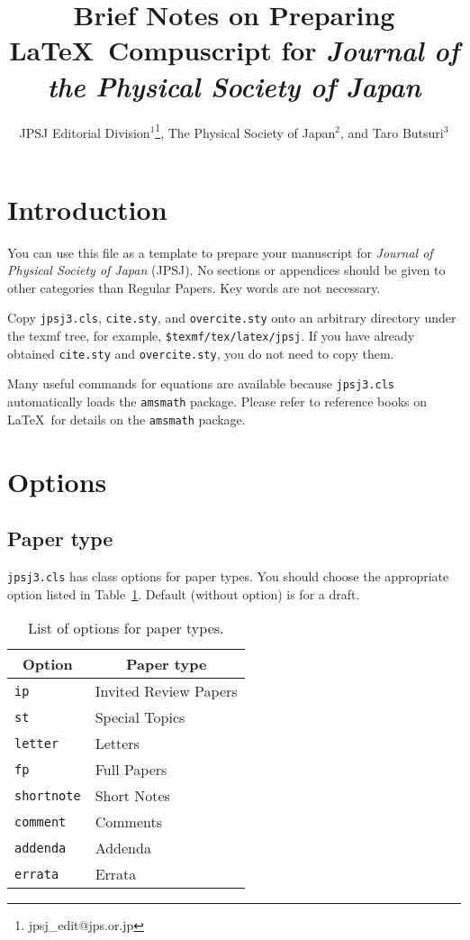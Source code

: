 \documentclass[letter,twocolumn]{jpsj3}
\title{Brief Notes on Preparing \LaTeX\ Compuscript for \textit{Journal of the Physical Society of Japan}}
\author{JPSJ Editorial Division$^1$\thanks{jpsj{\_}edit@jps.or.jp}, The Physical Society of Japan$^2$, and Taro Butsuri$^3$}
\begin{document}
\maketitle

\section{Introduction}

You can use this file as a template to prepare your manuscript for \textit{Journal of Physical Society of Japan} (JPSJ)\cite{jpsj,instructions}. No sections or appendices should be given to other categories than Regular Papers. Key words are not necessary.

Copy \verb|jpsj3.cls|, \verb|cite.sty|, and \verb|overcite.sty| onto an arbitrary directory under the texmf tree, for example, \verb|$texmf/tex/latex/jpsj|. If you have already obtained \verb|cite.sty| and \verb|overcite.sty|, you do not need to copy them.

Many useful commands for equations are available because \verb|jpsj3.cls| automatically loads the \verb|amsmath| package. Please refer to reference books on \LaTeX\ for details on the \verb|amsmath| package.

\section{Options}

\subsection{Paper type}

\verb|jpsj3.cls| has class options for paper types.  You should choose the appropriate option listed in Table~\ref{t1}.  Default (without option) is for a draft.

\begin{table}
\caption{List of options for paper types.}
\label{t1}
\begin{center}
\begin{tabular}{ll}
\hline
\multicolumn{1}{c}{Option} & \multicolumn{1}{c}{Paper type} \\
\hline
\verb|ip| & Invited Review Papers \\
\verb|st| & Special Topics \\
\verb|letter| & Letters \\
\verb|fp| & Full Papers \\
\verb|shortnote| & Short Notes \\
\verb|comment| & Comments \\
\verb|addenda| & Addenda \\
\verb|errata| & Errata \\
\hline
\end{tabular}
\end{center}
\end{table}
\end{document}

